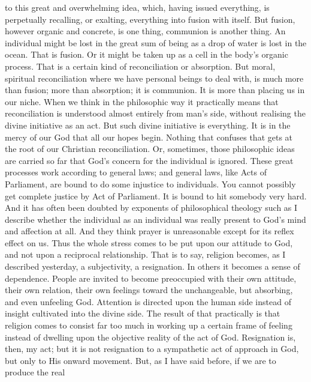 \documentclass[12pt,a5paper,twoside,titlepage]{book}
\begin{document}
to this great and overwhelming idea, 
which, having issued everything, is perpetually 
recalling, or exalting, everything into fusion 
with itself. But fusion, however organic and 
concrete, is one thing, communion is another 
thing. An individual might be lost in the great 
sum of being as a drop of water is lost in the 
ocean. That is fusion. Or it might be taken 
up as a cell in the body's organic process. 
That is a certain kind of reconciliation or 
absorption. But moral, spiritual reconciliation  
where we have personal beings to deal with, 
is much more than fusion; more than absorption; 
it is communion. It is more than placing 
us in our niche. When we think in the philosophic 
way it practically means that reconciliation 
is understood almost entirely from man's 
side, without realising the divine initiative as an 
act. But such divine initiative is everything. 
It is in the mercy of our God that all our hopes 
begin. Nothing that confuses that gets at the 
root of our Christian reconciliation. Or, sometimes,
those philosophic ideas are carried so far 
that God's concern for the individual is ignored. 
These great processes work according to general 
laws; and general laws, like Acts of Parliament, 
are bound to do some injustice to individuals. 
You cannot possibly get complete justice by Act 
of Parliament. It is bound to hit somebody 
very hard. And it has often been doubted by 
exponents of philosophical theology such as I 
describe whether the individual as an individual 
was really present to God's mind and affection 
at all. And they think prayer is unreasonable 
except for its reflex effect on us. Thus the 
whole stress comes to be put upon our attitude 
to God, and not upon a reciprocal relationship. 
That is to say, religion becomes, as I described 
yesterday, a subjectivity, a resignation. In 
others it becomes a sense of dependence. People 
are invited to become preoccupied with their 
own attitude, their own relation, their own 
feelings toward the unchangeable, but absorbing, 
and even unfeeling God. Attention is 
directed upon the human side instead of insight 
cultivated into the divine side. The result of 
that practically is that religion comes to consist 
far too much in working up a certain frame of 
feeling instead of dwelling upon the objective 
reality of the act of God. Resignation is, 
then, my act; but it is not resignation to 
a sympathetic act of approach in God, but 
only to His onward movement. But, as I 
have said before, if we are to produce the real 
\end{document}
